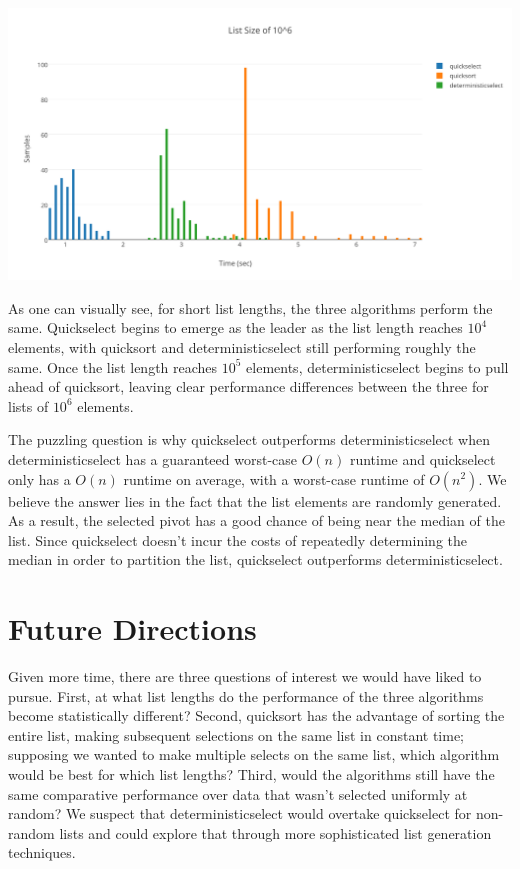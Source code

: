 \documentclass{article}
\begin{document}
\includegraphics[scale=0.62]{list10^6}

As one can visually see, for short list lengths, the three algorithms perform the same. Quickselect begins to emerge as the leader as the list length reaches $10^4$ elements, with quicksort and deterministicselect still performing roughly the same. Once the list length reaches  $10^5$ elements, deterministicselect begins to pull ahead of quicksort, leaving clear performance differences between the three for lists of $10^6$ elements.

The puzzling question is why quickselect outperforms deterministicselect when deterministicselect has a guaranteed worst-case $O(n)$ runtime and quickselect only has a $O(n)$ runtime on average, with a worst-case runtime of $O(n^2)$. We believe the answer lies in the fact that the list elements are randomly generated. As a result, the selected pivot has a good chance of being near the median of the list. Since quickselect doesn't incur the costs of repeatedly determining the median in order to partition the list, quickselect outperforms deterministicselect.

\section*{Future Directions}
\indent \indent Given more time, there are three questions of interest we would have liked to pursue. First, at what list lengths do the performance of the three algorithms become statistically different? Second, quicksort has the advantage of sorting the entire list, making subsequent selections on the same list in constant time; supposing we wanted to make multiple selects on the same list, which algorithm would be best for which list lengths? Third, would the algorithms still have the same comparative performance over data that wasn't selected uniformly at random? We suspect that deterministicselect would overtake quickselect for non-random lists and could explore that through more sophisticated list generation techniques.
\end{document}

